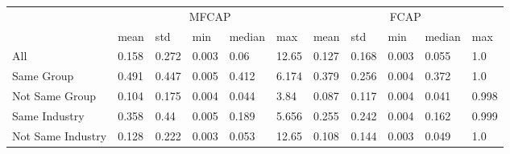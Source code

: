\begin{tabular}{lllllllllll}
\toprule
 & \multicolumn{5}{c}{MFCAP} & \multicolumn{5}{c}{FCAP} \\
 \cmidrule(lr){2-6} \cmidrule(lr){7-11}
 &       mean &    std &    min & median &    max &         mean &    std &    min & median &    max \\
\midrule
All               &      0.158 &  0.272 &  0.003 &   0.06 &  12.65 &        0.127 &  0.168 &  0.003 &  0.055 &    1.0 \\
Same Group        &      0.491 &  0.447 &  0.005 &  0.412 &  6.174 &        0.379 &  0.256 &  0.004 &  0.372 &    1.0 \\
Not Same Group    &      0.104 &  0.175 &  0.004 &  0.044 &   3.84 &        0.087 &  0.117 &  0.004 &  0.041 &  0.998 \\
Same Industry     &      0.358 &   0.44 &  0.005 &  0.189 &  5.656 &        0.255 &  0.242 &  0.004 &  0.162 &  0.999 \\
Not Same Industry &      0.128 &  0.222 &  0.003 &  0.053 &  12.65 &        0.108 &  0.144 &  0.003 &  0.049 &    1.0 \\
\bottomrule
\end{tabular}
